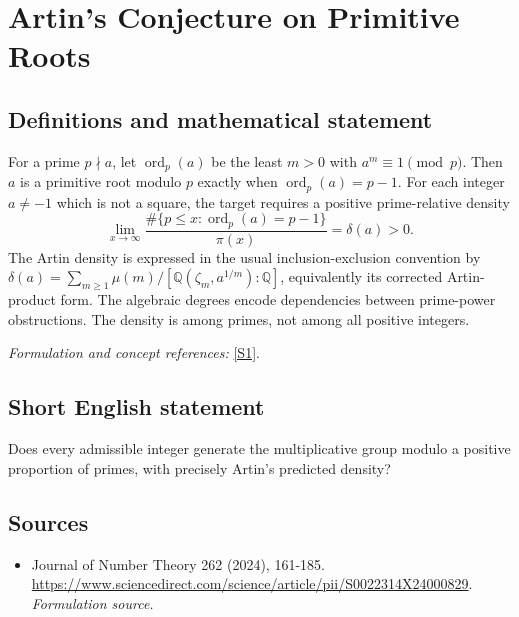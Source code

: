 \documentclass[11pt]{article}
\begin{document}
\section*{\texorpdfstring{Artin's Conjecture on Primitive Roots}{Artin's Conjecture on Primitive Roots}}\label{1183}
\subsection{Definitions and mathematical statement}
For a prime $p\nmid a$, let $\operatorname{ord}_p(a)$ be the least $m>0$ with $a^m\equiv1\pmod p$. Then $a$ is a primitive root modulo $p$ exactly when $\operatorname{ord}_p(a)=p-1$. For each integer $a\ne-1$ which is not a square, the target requires a positive prime-relative density
\[
 \lim_{x\to\infty}\frac{\#\{p\le x:\operatorname{ord}_p(a)=p-1\}}{\pi(x)}=\delta(a)>0.
\]
The Artin density is expressed in the usual inclusion-exclusion convention by
$\delta(a)=\sum_{m\ge1}\mu(m)/[{\mathbb{Q}}(\zeta_m,a^{1/m}):{\mathbb{Q}}]$, equivalently its corrected Artin-product form. The algebraic degrees encode dependencies between prime-power obstructions. The density is among primes, not among all positive integers.
\par\smallskip\textit{Formulation and concept references:} \href{https://www.sciencedirect.com/science/article/pii/S0022314X24000829}{[S1]}.

\subsection{Short English statement}
Does every admissible integer generate the multiplicative group modulo a positive proportion of primes, with precisely Artin's predicted density?
\subsection{Sources}
\begin{itemize}
\item[S1]Journal of Number Theory 262 (2024), 161-185.
\url{https://www.sciencedirect.com/science/article/pii/S0022314X24000829}.
\textit{Formulation source.}
\end{itemize}
\end{document}
